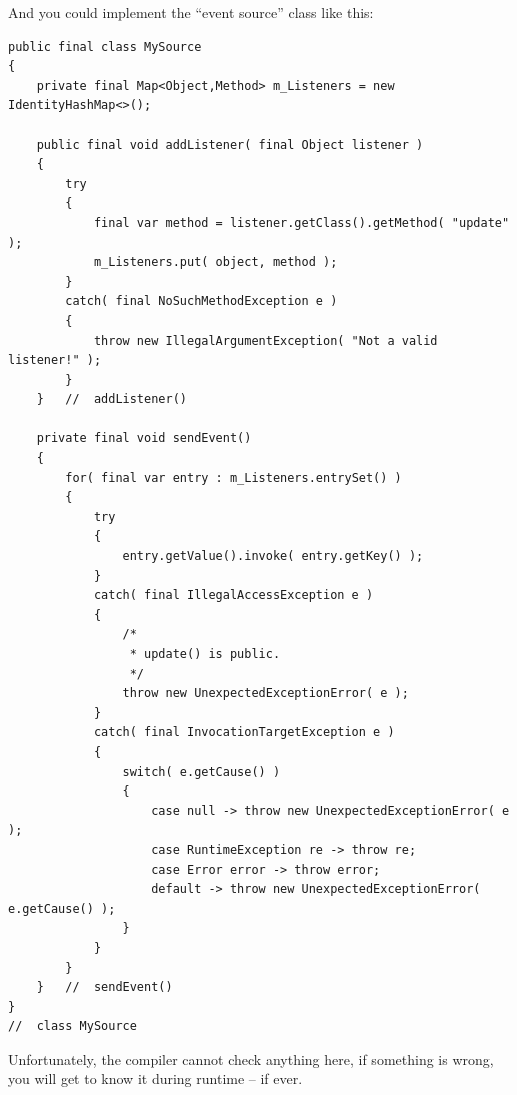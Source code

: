 \documentclass[11pt,a4paper, titlepage, parskip=half, headsepline, footsepline, cleardoublepage=current, headheight=1cm]{scrbook}
\begin{document}
And you could implement the “event source” class like this:
\begin{lstlisting}
public final class MySource
{
    private final Map<Object,Method> m_Listeners = new IdentityHashMap<>();
    
    public final void addListener( final Object listener )
    {
        try
        {
            final var method = listener.getClass().getMethod( "update" );
            m_Listeners.put( object, method );
        }
        catch( final NoSuchMethodException e )
        {
            throw new IllegalArgumentException( "Not a valid listener!" );
        }
    }   //  addListener()
    
    private final void sendEvent()
    {
        for( final var entry : m_Listeners.entrySet() )
        {
            try
            {
                entry.getValue().invoke( entry.getKey() );
            }
            catch( final IllegalAccessException e )
            {
                /*
                 * update() is public.
                 */
                throw new UnexpectedExceptionError( e );
            }
            catch( final InvocationTargetException e )
            {
                switch( e.getCause() )
                {
                    case null -> throw new UnexpectedExceptionError( e );
                    case RuntimeException re -> throw re;
                    case Error error -> throw error;
                    default -> throw new UnexpectedExceptionError( e.getCause() );
                }
            }
        }
    }   //  sendEvent()
}
//  class MySource
\end{lstlisting}

Unfortunately, the compiler cannot check anything here, if something is wrong, you will get to know it during runtime – if ever.
\end{document}
